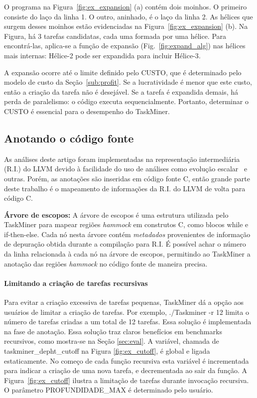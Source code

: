 \documentclass[sigconf]{acmart}
\newcommand\Taskminer{\mbox{\textsf{TaskMiner}}}
\begin{document}
O programa na Figura~\ref{fig:ex_expansion} (a) contém dois moinhos.
O primeiro consiste do laço da linha 1. O outro, aninhado, é o laço da linha 2.
As hélices que surgem desses moinhos estão evidenciadas na Figura~\ref{fig:ex_expansion} (b).
Na Figura, há 3 tarefas candidatas, cada uma formada por uma hélice.
Para encontrá-las, aplica-se a função de expansão (Fig.~\ref{fig:expand_alg})
nas hélices mais internas: \textsf{Hélice-2} pode ser expandida para incluir \textsf{Hélice-3}.

A expansão ocorre até o limite definido pelo \textsf{CUSTO}, que é determinado pelo modelo de custo
da Seção~\ref{sub:profit}. Se a lucratividade é menor que este custo, então
a criação da tarefa não é desejável. Se a tarefa é expandida demais, 
há perda de paralelismo: o código executa sequencialmente. Portanto, determinar o \textsf{CUSTO}
é essencial para o desempenho do {\Taskminer}.

\subsection{Anotando o código fonte}
\label{sub:ir}

As análises deste artigo foram implementadas na representa\c{c}\~{a}o intermediária (R.I.)
do LLVM devido à facilidade do uso de análises como evolução escalar~\cite[p.18]{Grosser12} e outras.
Porém, as anotações são inseridas em código fonte C, então grande
parte deste trabalho é o mapeamento de informações da R.I. do LLVM de volta
para código C.

\noindent
\textbf{Árvore de escopos:}
A árvore de escopos é uma estrutura utilizada pelo {\Taskminer} para mapear regiões {\em hammock} em construtos C, como blocos
\textsf{while} e \textsf{if-then-else}. Cada nó nesta árvore contém {\em metadados}
provenientes de informação de depuração obtida durante a compilação para R.I.
É possível achar o número da linha relacionada à cada nó na árvore de escopos, permitindo
ao {\Taskminer} a anotação das regiões {\em hammock} no código fonte de maneira precisa.

\paragraph{Limitando a criação de tarefas recursivas}
Para evitar a criação excessiva de tarefas pequenas, {\Taskminer} dá a opção
aos usuários de limitar a criação de tarefas. Por exemplo, \textsf{./Taskminer -r 12} limita o número
de tarefas criadas a um total de 12 tarefas. Essa solução é implementada na fase de anotação. 
Essa solução traz claros benefícios em benchmarks recursivos, como mostra-se na Seção \ref{sec:eval}. 
A variável, chamada de \textsf{taskminer\_depht\_cutoff} na Figura
\ref{fig:ex_cutoff}, é global e ligada estaticamente. 
No começo de cada função recursiva
esta variável é incrementada para indicar a criação de uma nova tarefa, 
e decrementada ao sair da função.
A Figura~\ref{fig:ex_cutoff} ilustra a limitação de tarefas 
durante invocação recursiva.
O parâmetro \textsf{PROFUNDIDADE\_MAX}
é determinado pelo usuário.
\end{document}
